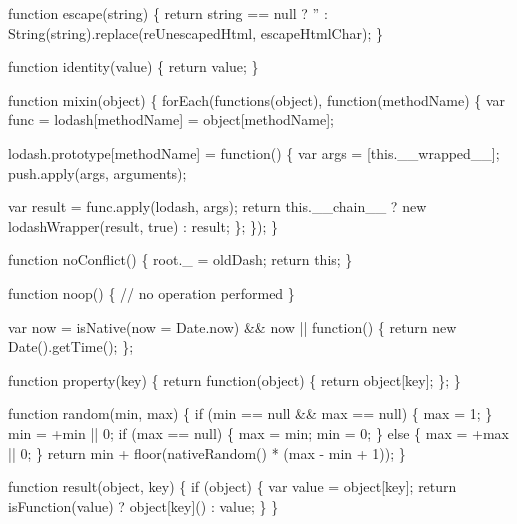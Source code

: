 \begin{DoxyCodeInclude}
{{  \textcolor{keyword}{function} escape(\textcolor{keywordtype}{string}) \{
    \textcolor{keywordflow}{return} \textcolor{keywordtype}{string} == null ? \textcolor{stringliteral}{''} : String(\textcolor{keywordtype}{string}).replace(reUnescapedHtml, escapeHtmlChar);
  \}

  \textcolor{keyword}{function} identity(value) \{
    \textcolor{keywordflow}{return} value;
  \}

  \textcolor{keyword}{function} mixin(\textcolor{keywordtype}{object}) \{
    forEach(functions(\textcolor{keywordtype}{object}), \textcolor{keyword}{function}(methodName) \{
      var func = lodash[methodName] = \textcolor{keywordtype}{object}[methodName];

      lodash.prototype[methodName] = \textcolor{keyword}{function}() \{
        var args = [this.\_\_wrapped\_\_];
        push.apply(args, arguments);

        var result = func.apply(lodash, args);
        \textcolor{keywordflow}{return} this.\_\_chain\_\_
          ? \textcolor{keyword}{new} lodashWrapper(result, \textcolor{keyword}{true})
          : result;
      \};
    \});
  \}

  \textcolor{keyword}{function} noConflict() \{
    root.\_ = oldDash;
    \textcolor{keywordflow}{return} \textcolor{keyword}{this};
  \}

  \textcolor{keyword}{function} noop() \{
    \textcolor{comment}{// no operation performed}
  \}

  var now = isNative(now = Date.now) && now || \textcolor{keyword}{function}() \{
    \textcolor{keywordflow}{return} \textcolor{keyword}{new} Date().getTime();
  \};

  \textcolor{keyword}{function} property(key) \{
    \textcolor{keywordflow}{return} \textcolor{keyword}{function}(object) \{
      \textcolor{keywordflow}{return} \textcolor{keywordtype}{object}[key];
    \};
  \}

  \textcolor{keyword}{function} random(min, max) \{
    \textcolor{keywordflow}{if} (min == null && max == null) \{
      max = 1;
    \}
    min = +min || 0;
    \textcolor{keywordflow}{if} (max == null) \{
      max = min;
      min = 0;
    \} \textcolor{keywordflow}{else} \{
      max = +max || 0;
    \}
    \textcolor{keywordflow}{return} min + floor(nativeRandom() * (max - min + 1));
  \}

  \textcolor{keyword}{function} result(\textcolor{keywordtype}{object}, key) \{
    \textcolor{keywordflow}{if} (\textcolor{keywordtype}{object}) \{
      var value = \textcolor{keywordtype}{object}[key];
      \textcolor{keywordflow}{return} isFunction(value) ? \textcolor{keywordtype}{object}[key]() : value;
    \}
  \}

}}
\end{DoxyCodeInclude}
